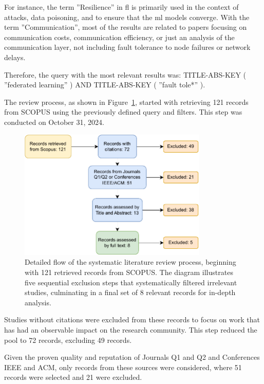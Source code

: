 For instance, the term ''Resilience'' in \ac{fl} is primarily used in the context of attacks, data poisoning, and to ensure that the \ac{ml} models converge. With the term ''Communication'', most of the results are related to papers focusing on communication costs, communication efficiency, or just an analysis of the communication layer, not including fault tolerance to node failures or network delays. 

Therefore, the query with the most relevant results was: TITLE-ABS-KEY ( ''federated learning'' ) AND TITLE-ABS-KEY ( ''fault tole*'' ).

The review process, as shown in Figure~\ref{fig:prisma}, started with retrieving 121 records from SCOPUS using the previously defined query and filters. This step was conducted on October 31, 2024.

\begin{figure}[!htb]
    \centering
    \includegraphics[width=0.8\textwidth]{figs/prisma.pdf}
    \caption[Systematic Literature Review Process]{Detailed flow of the systematic literature review process, beginning with 121 retrieved records from SCOPUS. The diagram illustrates five sequential exclusion steps that systematically filtered irrelevant studies, culminating in a final set of 8 relevant records for in-depth analysis.}
    \label{fig:prisma}
\end{figure}

Studies without citations were excluded from these records to focus on work that has had an observable impact on the research community. This step reduced the pool to 72 records, excluding 49 records.

Given the proven quality and reputation of Journals Q1 and Q2 and Conferences IEEE and ACM, only records from these sources were considered, where 51 records were selected and 21 were excluded.

